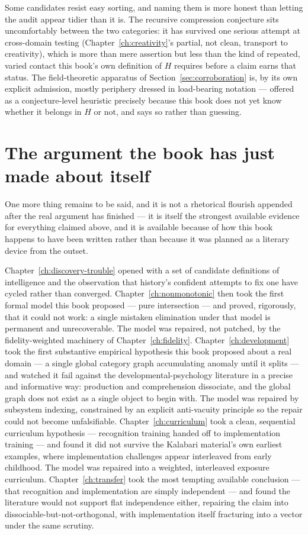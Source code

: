 Some candidates resist easy sorting, and naming them is more honest than letting the audit appear tidier than it is. The recursive compression conjecture sits uncomfortably between the two categories: it has survived one serious attempt at cross-domain testing (Chapter~\ref{ch:creativity}'s partial, not clean, transport to creativity), which is more than mere assertion but less than the kind of repeated, varied contact this book's own definition of $H$ requires before a claim earns that status. The field-theoretic apparatus of Section~\ref{sec:corroboration} is, by its own explicit admission, mostly periphery dressed in load-bearing notation --- offered as a conjecture-level heuristic precisely because this book does not yet know whether it belongs in $H$ or not, and says so rather than guessing.

\section{The argument the book has just made about itself}

One more thing remains to be said, and it is not a rhetorical flourish appended after the real argument has finished --- it is itself the strongest available evidence for everything claimed above, and it is available because of how this book happens to have been written rather than because it was planned as a literary device from the outset.

Chapter~\ref{ch:discovery-trouble} opened with a set of candidate definitions of intelligence and the observation that history's confident attempts to fix one have cycled rather than converged. Chapter~\ref{ch:nonmonotonic} then took the first formal model this book proposed --- pure intersection --- and proved, rigorously, that it could not work: a single mistaken elimination under that model is permanent and unrecoverable. The model was repaired, not patched, by the fidelity-weighted machinery of Chapter~\ref{ch:fidelity}. Chapter~\ref{ch:development} took the first substantive empirical hypothesis this book proposed about a real domain --- a single global category graph accumulating anomaly until it splits --- and watched it fail against the developmental-psychology literature in a precise and informative way: production and comprehension dissociate, and the global graph does not exist as a single object to begin with. The model was repaired by subsystem indexing, constrained by an explicit anti-vacuity principle so the repair could not become unfalsifiable. Chapter~\ref{ch:curriculum} took a clean, sequential curriculum hypothesis --- recognition training handed off to implementation training --- and found it did not survive the Kalabari material's own earliest examples, where implementation challenges appear interleaved from early childhood. The model was repaired into a weighted, interleaved exposure curriculum. Chapter~\ref{ch:transfer} took the most tempting available conclusion --- that recognition and implementation are simply independent --- and found the literature would not support flat independence either, repairing the claim into dissociable-but-not-orthogonal, with implementation itself fracturing into a vector under the same scrutiny.

